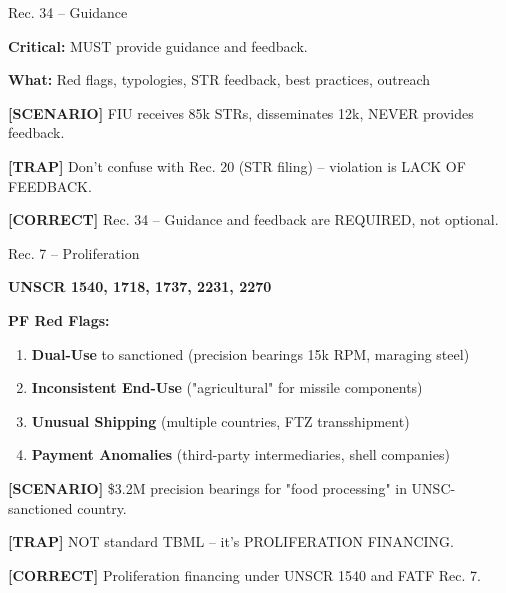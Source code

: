 \documentclass[8pt,aspectratio=169,fontsize=7pt]{beamer}
\renewcommand{\tiny}{\fontsize{4pt}{5pt}\selectfont}
\renewcommand{\normalsize}{\fontsize{8pt}{9pt}\selectfont}
\newcommand{\trap}[1]{%
	\begin{block}{\textcolor{redtrap}{\textbf{[TRAP]}}}
		\textcolor{redtrap}{\tiny #1}
	\end{block}
}
\newcommand{\scenario}[1]{%
	\begin{block}{\textbf{[SCENARIO]}}
		\tiny #1
	\end{block}
}
\newcommand{\correct}[1]{%
	\begin{block}{\textcolor{greencorrect}{\textbf{[CORRECT]}}}
		\textcolor{greencorrect}{\tiny #1}
	\end{block}
}
\begin{document}
	\begin{frame}{\normalsize Rec. 34 -- Guidance}
		
		\textbf{Critical:} MUST provide guidance and feedback.
		
		\textbf{What:} Red flags, typologies, STR feedback, best practices, outreach
		
		\scenario{FIU receives 85k STRs, disseminates 12k, NEVER provides feedback.}
		
		\trap{Don't confuse with Rec. 20 (STR filing) -- violation is LACK OF FEEDBACK.}
		
		\correct{Rec. 34 -- Guidance and feedback are REQUIRED, not optional.}
	\end{frame}
	
	\begin{frame}{\normalsize Rec. 7 -- Proliferation}
		
		\textbf{UNSCR 1540, 1718, 1737, 2231, 2270}
		
		\textbf{PF Red Flags:}
		\begin{enumerate}
			\item \textbf{Dual-Use} to sanctioned (precision bearings 15k RPM, maraging steel)
			\item \textbf{Inconsistent End-Use} ("agricultural" for missile components)
			\item \textbf{Unusual Shipping} (multiple countries, FTZ transshipment)
			\item \textbf{Payment Anomalies} (third-party intermediaries, shell companies)
		\end{enumerate}
		
		\scenario{\$3.2M precision bearings for "food processing" in UNSC-sanctioned country.}
		
		\trap{NOT standard TBML -- it's PROLIFERATION FINANCING.}
		
		\correct{Proliferation financing under UNSCR 1540 and FATF Rec. 7.}
	\end{frame}
	
\end{document}

